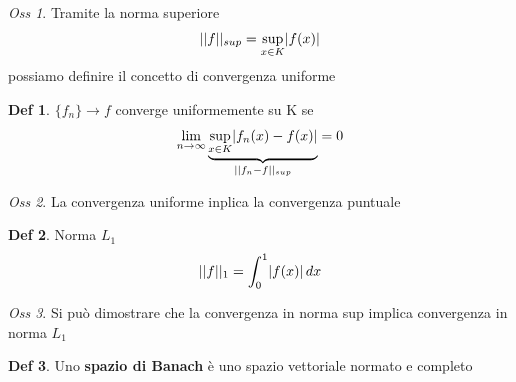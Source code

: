 \documentclass[a4paper,11pt]{report}
\theoremstyle{remark}
\newtheorem*{oss}{Oss}
\theoremstyle{definition}
\newtheorem*{Def}{Def}
\DeclarePairedDelimiter{\abs}{\lvert}{\rvert}
\begin{document}
\begin{oss}
	Tramite la norma superiore 
	\[||f||_{sup} = \sup_{x\in K} \abs{f(x)}\]
	possiamo definire il concetto di convergenza uniforme
\end{oss}

\begin{Def}
	$\{f_n\} \to f$ converge uniformemente su K se 
	\[\lim_{n\to\infty} \underbrace{\sup_{x\in K} \abs{f_n(x)-f(x)}}_{||f_n-f||_{sup}} =0\]
\end{Def}

\begin{oss}
	La convergenza uniforme inplica la convergenza puntuale
\end{oss}

\begin{Def}
	Norma $L_1$
	\[||f||_1 = \int_0^1 \abs{f(x)}\, dx\]
\end{Def}

\begin{oss}
	Si può dimostrare che la convergenza in norma sup implica convergenza in norma $L_1$
\end{oss}

\begin{Def}
	Uno \textbf{spazio di Banach} è uno spazio vettoriale normato e completo
\end{Def}
\end{document}
